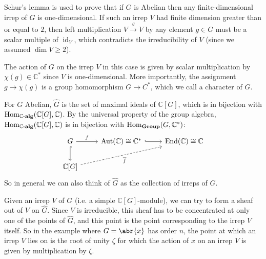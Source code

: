 \documentclass[11pt,leqno]{article}
\theoremstyle{plain}
\theoremstyle{definition}
\numberwithin{equation}{section}
\numberwithin{lem}{section}
\DeclareMathOperator{\Hom}{Hom}
\DeclareMathOperator{\id}{id}
\DeclareMathOperator{\Aut}{Aut}
\DeclareMathOperator{\End}{End}
\newcommand{\catname}[1]{{\normalfont\mathbf{#1}}}
\newcommand{\alg}{\text{-}\catname{alg}}
\newcommand{\Group}{\catname{Group}}
\begin{document}
Schur's lemma is used to prove that if $G$ is Abelian then any finite-dimensional irrep of $G$ is one-dimensional. If such an irrep $V$ had finite dimension greater than or equal to $2$, then left multiplication $V\xrightarrow{g}V$ by any element $g\in G$ must be a scalar multiple of $\id_V$, which contradicts the irreducibility of $V$ (since we assumed $\dim V\geq 2$). 

The action of $G$ on the irrep $V$ in this case is given by scalar multiplication by $\chi(g)\in \mathbb C^\ast$ since $V$ is one-dimensional. More importantly, the assignment $g\to\chi(g)$ is a group homomorphism $G\to C^\ast$, which we call a character of $G$.

For $G$ Abelian, $\widehat G$ is the set of maximal ideals of $\mathbb C[G]$, which is in bijection with $\Hom_{\mathbb C\alg}(\mathbb C[G],\mathbb C)$. By the universal property of the group algebra, $\Hom_{\mathbb C\alg}(\mathbb C[G],\mathbb C)$ is in bijection with $ \Hom_{\Group}(G,\mathbb C^\ast)$:
\[\begin{tikzcd}[ampersand replacement=\&]
	G \& {\Aut(\mathbb C)\cong \mathbb C^\ast} \& {\End(\mathbb C)\cong \mathbb C} \\
	{\mathbb C[G]}
	\arrow["f", from=1-1, to=1-2]
	\arrow[hook, from=1-1, to=2-1]
	\arrow[hook, from=1-2, to=1-3]
	\arrow["{\overline f}"', dashed, from=2-1, to=1-3]
\end{tikzcd}\]
So in general we can also think of $\widehat G$ as the collection of irreps of $G$.

Given an irrep $V$ of $G$ (i.e. a simple $\mathbb C[G]$-module), we can try to form a sheaf out of $V$ on $\widehat G$. Since $V$ is irreducible, this sheaf has to be concentrated at only one of the points of $\widehat{G}$, and this point is the point corresponding to the irrep $V$ itself. So in the example where $G = \abr{x}$ has order $n$, the point at which an irrep $V$ lies on is the root of unity $\zeta$ for which the action of $x$ on an irrep $V$ is given by multiplication by $\zeta$.

\begin{figure}[h]
  \centering
\end{figure}
\end{document}
